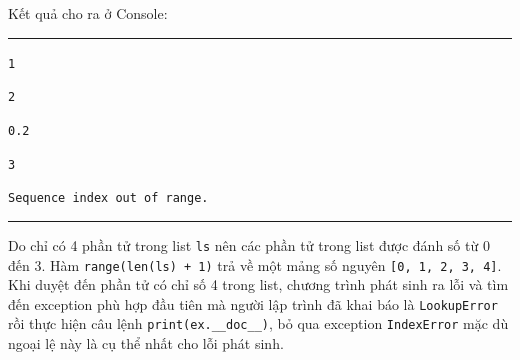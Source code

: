 \noindent
\resetlinenumber
Kết quả cho ra ở Console:\\
\rule{\linewidth}{0.2mm}\par
\begin{linenumbers}
	\texttt{1}\par
	\texttt{2}\par
	\texttt{0.2}\par
	\texttt{3}\par
	\texttt{Sequence index out of range.}\par
\end{linenumbers}
\rule{\linewidth}{0.2mm}\par
\resetlinenumber
Do chỉ có 4 phần tử trong list \texttt{ls} nên các phần tử trong list được đánh số từ 0 đến 3. Hàm \texttt{range(len(ls)~+~1)} trả về một mảng số nguyên \texttt{[0, 1, 2, 3, 4]}. Khi duyệt đến phần tử có chỉ số 4 trong list, chương trình phát sinh ra lỗi và tìm đến exception phù hợp đầu tiên mà người lập trình đã khai báo là \texttt{LookupError} rồi thực hiện câu lệnh \texttt{print(ex.\_\_doc\_\_)}, bỏ qua exception \texttt{IndexError} mặc dù ngoại lệ này là cụ thể nhất cho lỗi phát sinh.
\newpage
